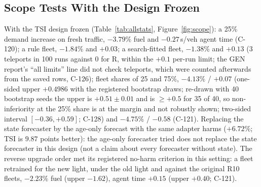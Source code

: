 \subsection{Scope Tests With the Design Frozen}\label{sec:scope}
With the TSI design frozen (Table~\ref{tab:allstats}, Figure~\ref{fig:scope}): a 25\% demand increase on fresh traffic, $-3.79\%$ fuel and $-0.27$\,s/veh agent
time (C-120); a rule fleet, $-1.84\%$ and $+0.03$; a search-fitted fleet, $-1.38\%$ and $+0.13$ (3 teleports in 100 runs against 0 for R, within the $+0.1$ per-run limit; the GEN report's ``all limits'' line did not check teleports, which were counted afterwards from the saved rows, C-126); fleet shares of 25 and 75\%, $-4.13\%$
/ $+0.07$ (one-sided upper $+0.4986$ with the registered bootstrap draws; re-drawn with 40 bootstrap seeds the upper is
$+0.51\pm0.01$ and is $\ge+0.5$ for 35 of 40, so non-inferiority at the 25\% share is at the margin and not robustly shown; two-sided
interval $[-0.36, +0.59]$; C-128) and $-4.75\%$ / $-0.58$ (C-121). Replacing the state forecaster by the age-only forecast with the same
adapter harms ($+6.72\%$; TSI is $9.87$ points better): the age-only forecaster tried does not replace the state forecaster in this
design (not a claim about every forecaster without state). The reverse upgrade order met its registered no-harm criterion
in this setting: a fleet retrained for the new light, under the old light and against the original R10
fleets, $-2.23\%$ fuel (upper $-1.62$), agent time $+0.15$ (upper $+0.40$; C-121).
